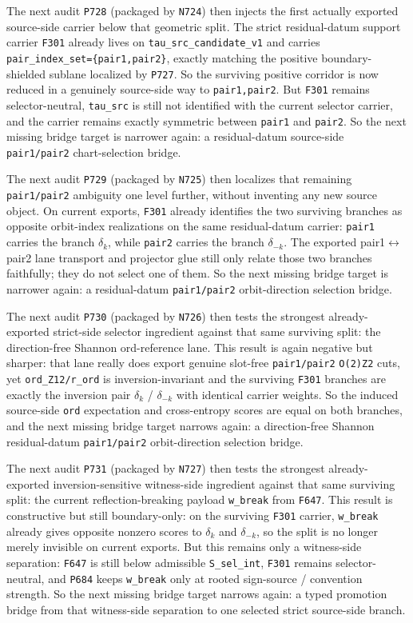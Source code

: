 \documentclass[11pt,a4paper]{article}
\begin{document}
The next audit \texttt{P728} (packaged by \texttt{N724}) then injects the first actually exported source-side carrier below that
geometric split. The strict residual-datum support carrier \texttt{F301} already lives on \texttt{tau\_src\_candidate\_v1}
and carries \texttt{pair\_index\_set=\{pair1,pair2\}}, exactly matching the positive boundary-shielded sublane localized by
\texttt{P727}. So the surviving positive corridor is now reduced in a genuinely source-side way to \texttt{pair1,pair2}.
But \texttt{F301} remains selector-neutral, \texttt{tau\_src} is still not identified with the current selector carrier,
and the carrier remains exactly symmetric between \texttt{pair1} and \texttt{pair2}. So the next missing bridge target is
narrower again: a residual-datum source-side \texttt{pair1/pair2} chart-selection bridge.

The next audit \texttt{P729} (packaged by \texttt{N725}) then localizes that remaining \texttt{pair1/pair2} ambiguity one level further,
without inventing any new source object. On current exports, \texttt{F301} already identifies the two surviving branches as opposite
orbit-index realizations on the same residual-datum carrier:
\texttt{pair1} carries the branch $\delta_k$, while \texttt{pair2} carries the branch $\delta_{-k}$.
The exported pair1$\leftrightarrow$pair2 lane transport and projector glue still only relate those two branches faithfully;
they do not select one of them. So the next missing bridge target is narrower again:
a residual-datum \texttt{pair1/pair2} orbit-direction selection bridge.

The next audit \texttt{P730} (packaged by \texttt{N726}) then tests the strongest already-exported strict-side selector ingredient
against that same surviving split: the direction-free Shannon ord-reference lane.
This result is again negative but sharper: that lane really does export genuine slot-free \texttt{pair1/pair2} \texttt{O(2)\textrightarrow Z2} cuts,
yet \texttt{ord\_Z12/r\_ord} is inversion-invariant and the surviving \texttt{F301} branches are exactly the inversion pair
$\delta_k$ / $\delta_{-k}$ with identical carrier weights.
So the induced source-side \texttt{ord} expectation and cross-entropy scores are equal on both branches,
and the next missing bridge target narrows again:
a direction-free Shannon residual-datum \texttt{pair1/pair2} orbit-direction selection bridge.

The next audit \texttt{P731} (packaged by \texttt{N727}) then tests the strongest already-exported inversion-sensitive witness-side ingredient
against that same surviving split: the current reflection-breaking payload \texttt{w\_break} from \texttt{F647}.
This result is constructive but still boundary-only:
on the surviving \texttt{F301} carrier, \texttt{w\_break} already gives opposite nonzero scores to $\delta_k$ and $\delta_{-k}$,
so the split is no longer merely invisible on current exports.
But this remains only a witness-side separation:
\texttt{F647} is still below admissible \texttt{S\_sel\_int}, \texttt{F301} remains selector-neutral,
and \texttt{P684} keeps \texttt{w\_break} only at rooted sign-source / convention strength.
So the next missing bridge target narrows again:
a typed promotion bridge from that witness-side separation to one selected strict source-side branch.
\end{document}
